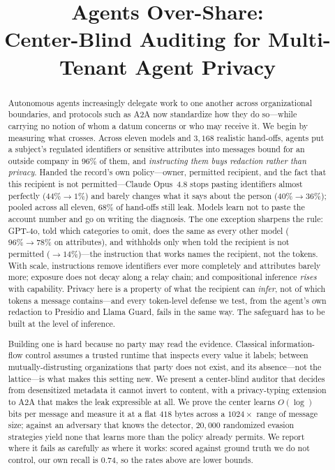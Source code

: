 \documentclass[conference,compsoc]{IEEEtran}
\begin{document}
\title{Agents Over-Share:\\
Center-Blind Auditing for Multi-Tenant Agent Privacy}

\author{
}

\maketitle

\begin{abstract}
Autonomous agents increasingly delegate work to one another across organizational
boundaries, and protocols such as A2A now standardize how they do so---while
carrying no notion of whom a datum concerns or who may receive it. We begin by
measuring what crosses. Across eleven models and $3{,}168$ realistic hand-offs,
agents put a subject's regulated identifiers or sensitive attributes into messages bound for an outside company in $96\%$ of them, and \emph{instructing them buys redaction rather than
privacy}. Handed the record's own policy---owner, permitted recipient, and the
fact that this recipient is not permitted---Claude Opus~4.8 stops pasting identifiers almost perfectly ($44\%\!\to\!1\%$) and barely changes what it says about the person ($40\%\!\to\!36\%$); pooled across all eleven, $68\%$ of hand-offs still leak. Models learn not to paste the account number and go on writing the diagnosis. The one exception sharpens the rule: GPT-4o, told which categories to omit, does the same as every other model ($96\%\!\to\!78\%$ on attributes), and withholds only when told the recipient is not permitted ($\to\!14\%$)---the instruction that works names the recipient, not the tokens.
With scale, instructions remove identifiers ever more completely and attributes barely more; exposure does not decay
along a relay chain; and compositional inference \emph{rises} with capability. Privacy here is a
property of what the recipient can \emph{infer}, not of which tokens a message
contains---and every token-level defense we test, from the agent's own redaction to
Presidio and Llama Guard, fails in the same way. The safeguard has to be built at
the level of inference.

Building one is hard because no party may read the evidence. Classical
information-flow control assumes a trusted runtime that inspects every value it
labels; between mutually-distrusting organizations that party does not exist, and
its absence---not the lattice---is what makes this setting new. We present a
center-blind auditor that decides from desensitized metadata it cannot invert to
content, with a privacy-typing extension to A2A that makes the leak expressible at
all. We prove the center learns $O(\log)$ bits per message and measure it at a flat
$418$ bytes across a $1024\times$ range of message size; against an adversary that
knows the detector, $20{,}000$ randomized evasion strategies yield none that learns
more than the policy already permits. We report where it fails as carefully as
where it works: scored against ground truth we do not control, our own recall is
$0.74$, so the rates above are lower bounds.
\end{abstract}
\end{document}
